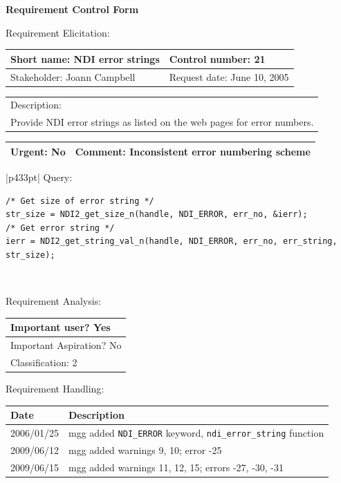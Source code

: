 \begin{center}\Large\bf
Requirement Control Form
\end{center}
\vspace{24pt}

Requirement Elicitation:

\begin{tabular}{|p{211pt}|p{211pt}|} \hline
Short name: NDI error strings & Control number: 21\\ \hline
Stakeholder: Joann Campbell & Request date: June 10, 2005\\
\end{tabular}
\begin{tabular}{|p{433pt}|} \hline
Description: \\ 
Provide NDI error strings as listed on the web pages for error numbers. \\
\hline
\end{tabular} 
\begin{tabular}{|p{211pt}|p{211pt}|} \hline
Urgent: No & Comment: Inconsistent error numbering scheme\\ \hline
\end{tabular}

\vspace{12pt}

\begin{tabular}{|p{433pt}|} \hline
Query: 
\begin{verbatim}
/* Get size of error string */
str_size = NDI2_get_size_n(handle, NDI_ERROR, err_no, &ierr);
/* Get error string */
ierr = NDI2_get_string_val_n(handle, NDI_ERROR, err_no, err_string, str_size);
\end{verbatim} \\ \hline
\end{tabular}
\vspace{24pt}

Requirement Analysis:

\begin{tabular}{|p{433pt}|} \hline
Important user? Yes \\ \hline
Important Aspiration? No \\ \hline
Classification: 2 \\ \hline
\end{tabular}
\vspace{24pt}

Requirement Handling:

\begin{tabular}{|p{72pt}|p{351pt}|} \hline
Date & Description \\ \hline
2006/01/25 & mgg added \texttt{NDI\_ERROR} keyword,
\texttt{ndi\_error\_string} function \\ \hline
2009/06/12 & mgg added warnings 9, 10; error -25 \\ \hline
2009/06/15 & mgg added warnings 11, 12, 15; errors -27, -30, -31 \\ \hline
\end{tabular}
